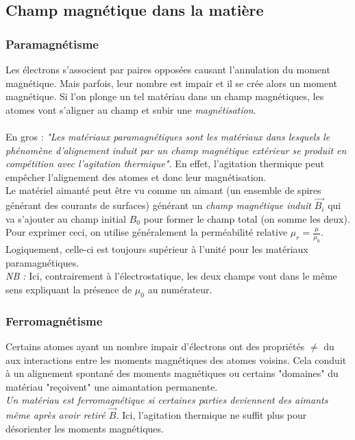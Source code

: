 \documentclass	[11pt, a4paper, openany]{book}
\begin{document}
\subsection{Champ magnétique dans la matière}
\subsubsection{Paramagnétisme}
Les électrons s'associent par paires opposées causant l'annulation du moment magnétique. Mais parfois, leur nombre est impair et il se crée alors un moment magnétique. Si l'on plonge un tel matériau dans un champ magnétiques, les atomes vont s'aligner au champ et subir une \textit{magnétisation}.\\
\\
En gros : \textit{"Les matériaux paramagnétiques sont les matériaux dans lesquels le phénomène d'alignement induit par un champ magnétique extérieur se produit en compétition avec l'agitation thermique".} En effet, l'agitation thermique peut empêcher l'alignement des atomes et donc leur magnétisation.\\

Le matériel aimanté peut être vu comme un aimant (un ensemble de spires générant des courants de surfaces) générant un \textit{champ magnétique induit} $\vec{B_i}$ qui va s'ajouter au champ initial $B_0$ pour former le champ total (on somme les deux). Pour exprimer ceci, on utilise généralement la perméabilité relative $\mu_r = \frac{\mu}{\mu_0}$. Logiquement, celle-ci est toujours supérieur à l'unité pour les matériaux paramagnétiques.\\

\textit{NB :} Ici, contrairement à l'électrostatique, les deux champs vont dans le même sens expliquant la présence de $\mu_0$ au numérateur.

\subsubsection{Ferromagnétisme}
Certains atomes ayant un nombre impair d'électrons ont des propriétés $\neq$ du aux interactions entre les moments magnétiques des atomes voisins.  Cela conduit à un alignement spontané des moments magnétiques ou certains "domaines" du matériau "reçoivent" une aimantation permanente.\\

\textit{Un matériau est ferromagnétique si certaines parties deviennent des aimants même après avoir retiré $\vec{B}$.} Ici, l'agitation thermique ne suffit plus pour désorienter les moments magnétiques.
\end{document}
